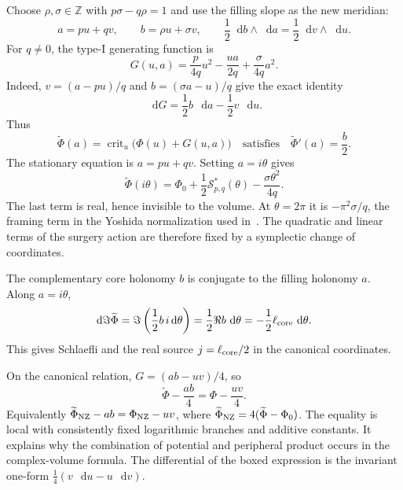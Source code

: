 \documentclass[11pt,a4paper]{article}
\numberwithin{equation}{section}
\theoremstyle{definition}
\theoremstyle{remark}
\newcommand{\dd}{\mathop{}\!\mathrm d}
\newcommand{\ZZ}{\mathbb Z}
\begin{document}
Choose $\rho,\sigma\in\ZZ$ with $p\sigma-q\rho=1$ and use
the filling slope as the new meridian:
\begin{equation}
 a=pu+qv,\qquad b=\rho u+\sigma v,\qquad
 \frac12\dd b\wedge\dd a=\frac12\dd v\wedge\dd u.
 \label{eq:NZcanonicalfilling}
\end{equation}
For $q\ne0$, the type-I generating function is
\begin{equation}
 \boxed{G(u,a)=\frac{p}{4q}u^2-\frac{ua}{2q}
                         +\frac{\sigma}{4q}a^2.}
 \label{eq:NZcanonicalkernel}
\end{equation}
Indeed, $v=(a-pu)/q$ and $b=(\sigma a-u)/q$ give the exact identity
\begin{equation}
 \dd G=\frac12b\,\dd a-\frac12v\,\dd u.
 \label{eq:NZgeneratingidentity}
\end{equation}
Thus
\[
 \widetilde\Phi(a)=\operatorname{crit}_u\bigl(\Phi(u)+G(u,a)\bigr)
 \quad\text{satisfies}\quad
 \widetilde\Phi'(a)=\frac b2.
\]
The stationary equation is $a=pu+qv$. Setting $a=i\theta$ gives
\begin{equation}
 \widetilde\Phi(i\theta)
 =\Phi_0+\frac12\mathcal S^*_{p,q}(\theta)
          -\frac{\sigma\theta^2}{4q}.
 \label{eq:NZcanonicalaction}
\end{equation}
The last term is real, hence invisible to the volume. At
$\theta=2\pi$ it is $-\pi^2\sigma/q$, the framing term in
the Yoshida normalization used in~\cite[equation (5.9)]{WongYangDehn}.
The quadratic and linear terms of the surgery action are therefore
fixed by a symplectic change of coordinates.

The complementary core holonomy $b$ is conjugate to the filling
holonomy $a$. Along $a=i\theta$,
\[
 \dd\Im\widetilde\Phi
   =\Im\left(\frac12b\,i\dd\theta\right)
   =\frac12\Re b\,\dd\theta
   =-\frac12\ell_{\rm core}\,\dd\theta.
\]
This gives Schlaefli and the real source
$j=\ell_{\rm core}/2$ in the canonical coordinates.

On the canonical relation, $G=(ab-uv)/4$, so
\begin{equation}
 \boxed{\widetilde\Phi-\frac{ab}{4}
                  =\Phi-\frac{uv}{4}.}
 \label{eq:NZinvariantpotential}
\end{equation}
Equivalently $\widetilde\Phi_{\rm NZ}-ab=\Phi_{\rm NZ}-uv$,
where $\widetilde\Phi_{\rm NZ}=4(\widetilde\Phi-\Phi_0)$.
The equality is local with consistently fixed logarithmic branches
and additive constants. It explains why the combination of potential
and peripheral product occurs in the complex-volume formula.
The differential of the boxed expression is the invariant one-form
$\tfrac14(v\,\dd u-u\,\dd v)$.
\end{document}

